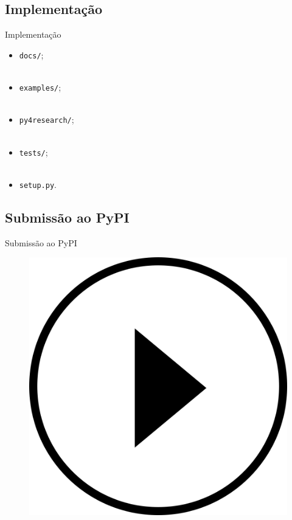 \subsection{Implementação}
\label{ss.implementation}

\begin{frame}{Implementação}
	\justify
	\begin{itemize}
		\item<1> \texttt{docs/};
		\\~\\
		\item<2> \texttt{examples/};
		\\~\\
		\item<3> \texttt{py4research/};
		\\~\\
		\item<4> \texttt{tests/};
		\\~\\
		\item<5> \texttt{setup.py}.
	\end{itemize}
\end{frame}

\subsection{Submissão ao PyPI}
\label{ss.pypi_submission}

\begin{frame}{Submissão ao PyPI}
\end{frame}

\begin{frame}{}
	\begin{figure}
		\centering
		\includegraphics[scale=0.125]{figs/video_play.png}
	\end{figure}
\end{frame}

